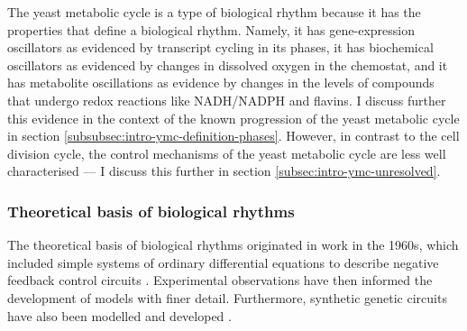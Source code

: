 The yeast metabolic cycle is a type of biological rhythm because it has the properties that define a biological rhythm.
Namely, it has gene-expression oscillators as evidenced by transcript cycling in its phases,
it has biochemical oscillators as evidenced by changes in dissolved oxygen in the chemostat,
and it has metabolite oscillations as evidence by changes in the levels of compounds that undergo redox reactions like NADH/NADPH and flavins.
I discuss further this evidence in the context of the known progression of the yeast metabolic cycle in section \ref{subsubsec:intro-ymc-definition-phases}.
However, in contrast to the cell division cycle, the control mechanisms of the yeast metabolic cycle are less well characterised --- I discuss this further in section \ref{subsec:intro-ymc-unresolved}.

\subsubsection{Theoretical basis of biological rhythms}
\label{subsubsec:intro-ymc-biological_rhythms-theoretical_basis}

The theoretical basis of biological rhythms originated in work in the 1960s, which included simple systems of ordinary differential equations to describe negative feedback control circuits \parencite{goodwinOscillatoryBehaviorEnzymatic1965, griffithMathematicsCellularControl1968}.
Experimental observations have then informed the development of models with finer detail.
Furthermore, synthetic genetic circuits have also been modelled and developed \parencite{elowitzSyntheticOscillatoryNetwork2000}.

